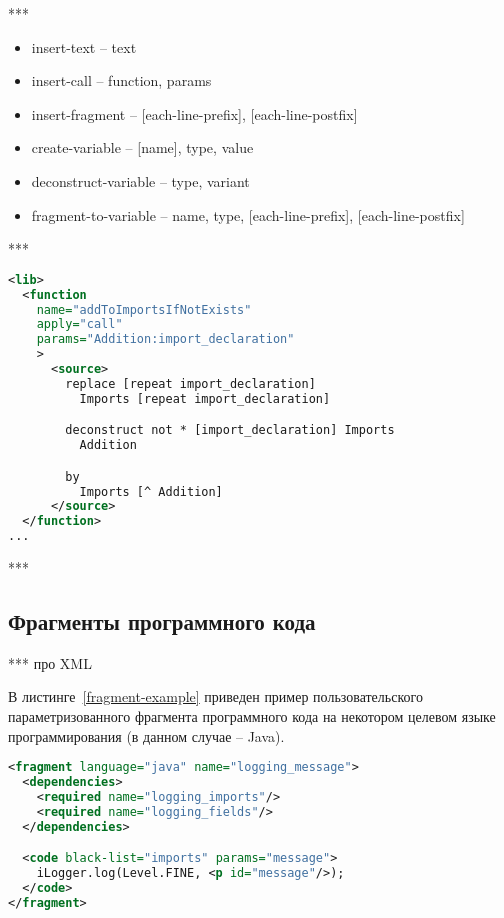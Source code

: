 ***

\begin{itemize}
  \item insert-text -- text
  \item insert-call -- function, params
  \item insert-fragment -- [each-line-prefix], [each-line-postfix]
  \item create-variable -- [name], type, value
  \item deconstruct-variable -- type, variant
  \item fragment-to-variable -- name, type, [each-line-prefix], [each-line-postfix]
\end{itemize}

***

\begin{lstlisting}[frame=single, language=XML, label={annotation-lib-example}, caption={Пример}]
<lib>
  <function
    name="addToImportsIfNotExists"
    apply="call"
    params="Addition:import_declaration"
    >
      <source>
        replace [repeat import_declaration]
          Imports [repeat import_declaration]

        deconstruct not * [import_declaration] Imports
          Addition

        by
          Imports [^ Addition]
      </source>
  </function>
...
\end{lstlisting}

***

\subsection{Фрагменты программного кода}

***
про XML

В листинге~\ref{fragment-example} приведен пример пользовательского параметризованного фрагмента программного кода на некотором целевом языке программирования (в данном случае -- Java).

\begin{lstlisting}[frame=single, language=XML, label={fragment-example}, caption={Пример пользовательского фрагмента}]
<fragment language="java" name="logging_message">
  <dependencies>
    <required name="logging_imports"/>
    <required name="logging_fields"/>
  </dependencies>

  <code black-list="imports" params="message">
    iLogger.log(Level.FINE, <p id="message"/>);
  </code>
</fragment>
\end{lstlisting}

